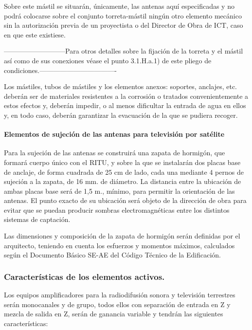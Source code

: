 Sobre este mástil se situarán, únicamente, las antenas aquí especificadas y no podrá colocarse sobre el conjunto torreta-mástil ningún otro elemento mecánico sin la autorización previa de un proyectista o del Director de Obra de ICT, caso en que este existiese.

---------------------------Para otros detalles sobre la fijación de la torreta y el mástil así como de sus conexiones véase el punto 3.1.H.a.1) de este pliego de condiciones.----------------------------------

Los mástiles, tubos de mástiles y los elementos anexos: soportes, anclajes, etc. deberán ser de materiales resistentes a la corrosión o tratados convenientemente a estos efectos y, deberán impedir, o al menos dificultar la entrada de agua en ellos y, en todo caso, deberán garantizar la evacuación de la que se pudiera recoger.

\paragraph{Elementos de sujeción de las antenas para televisión por satélite}

Para la sujeción de las antenas se construirá una zapata de hormigón, que formará cuerpo único con el RITU, y sobre la que se instalarán dos placas base de anclaje, de forma cuadrada de 25 cm de lado, cada una mediante 4 pernos de sujeción a la zapata, de 16 mm. de diámetro. La distancia entre la ubicación de ambas placas base será de 1,5 m., mínimo, para permitir la orientación de las antenas. El punto exacto de su ubicación será objeto de la dirección de obra para evitar que se puedan producir sombras electromagnéticas entre los distintos sistemas de captación.

Las dimensiones y composición de la zapata de hormigón serán definidas por el arquitecto, teniendo en cuenta los esfuerzos y momentos máximos, calculados según el Documento Básico SE-AE del Código Técnico de la Edificación.

\subsubsection{Características de los elementos activos.}

Los equipos amplificadores para la radiodifusión sonora y televisión terrestres serán monocanales y de grupo, todos ellos con separación de entrada en Z y mezcla de salida en Z, serán de ganancia variable y tendrán las siguientes características:

